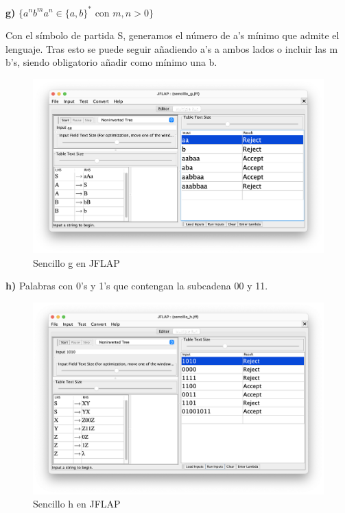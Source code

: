 \textbf{g)} $\{ a^{n} b^{m} a^{n} \in \{a,b\}^{\ast}$ con $m,n > 0\}$

Con el símbolo de partida S, generamos el número de a's mínimo que admite el lenguaje. Tras esto se puede seguir añadiendo a's a ambos lados o incluir las m b's,
siendo obligatorio añadir como mínimo una b. 

\begin{figure}[H] 
	\centering
	\includegraphics[scale=0.4]{../practica_1/images/sencillo_g.png} 
	\caption{Sencillo g en JFLAP} 
    \label{fig:sencillo_g}
\end{figure}

\textbf{h)}  Palabras con 0's y 1's que contengan la subcadena 00 y 11.

\begin{figure}[H] 
	\centering
	\includegraphics[scale=0.35]{../practica_1/images/sencillo_h.png} 
	\caption{Sencillo h en JFLAP} 
    \label{fig:sencillo_h}
\end{figure}

